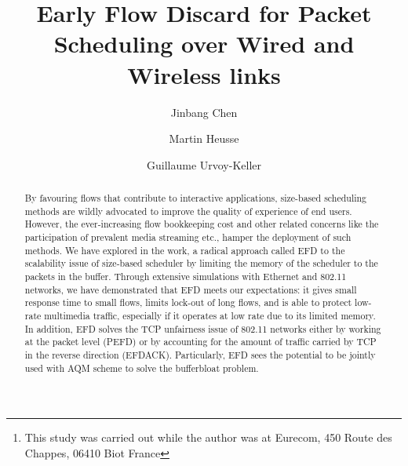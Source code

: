 \documentclass[preprint,12pt]{elsarticle}
\begin{document}
\begin{frontmatter}



\title{Early Flow Discard for Packet Scheduling over Wired and Wireless links}


\author[*]{Jinbang Chen}
\author[**]{Martin Heusse}
\author[***]{Guillaume Urvoy-Keller}
\address[*]{East China Normal University, China\footnote{This study was carried out while the author was at Eurecom, 450 Route des Chappes, 06410 Biot France}}
\address[**]{Laboratoire LIG CNRS UMR 5217, Grenoble, France}
\address[***]{Univ. Nice Sophia Antipolis, CNRS, I3S, UMR 7271, 06900 Sophia Antipolis}
\begin{abstract}
By favouring flows that contribute to interactive applications, size-based scheduling methods are wildly advocated to improve the quality of experience of end users. However, the ever-increasing flow bookkeeping cost and other related concerns like the participation of prevalent media streaming etc., hamper the deployment of such methods. We have explored in the work, a radical approach called EFD to the scalability issue of size-based scheduler by limiting the memory of the scheduler to the packets in the buffer. Through extensive simulations with Ethernet and 802.11 networks, we have demonstrated that EFD meets our expectations: it gives small response time to small flows, limits lock-out of long flows, and is able to protect low-rate multimedia traffic, especially if it operates at low rate due to its limited memory. In addition, EFD solves the TCP unfairness issue of 802.11 networks either by working at the packet level (PEFD) or by accounting for the amount of traffic carried by TCP in the reverse direction (EFDACK). Particularly, EFD sees the potential to be jointly used with AQM scheme to solve the bufferbloat problem. 
\end{abstract}


\end{frontmatter}
\end{document}
